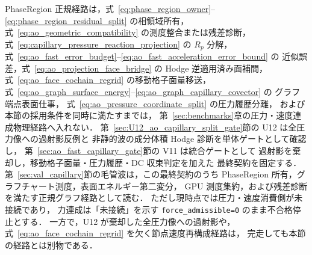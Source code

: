 PhaseRegion 正規経路は，式~\eqref{eq:phase_region_owner}--\eqref{eq:phase_region_residual_split} の相領域所有，
式~\eqref{eq:ao_geometric_compatibility} の測度整合または残差診断，
式~\eqref{eq:capillary_pressure_reaction_projection} の $R_p$ 分解，
式~\eqref{eq:ao_fast_error_budget}--\eqref{eq:ao_fast_acceleration_error_bound} の
近似誤差，式~\eqref{eq:ao_projection_face_bridge} の Hodge 逆適用済み面補間，
式~\eqref{eq:ao_face_cochain_regrid} の移動格子面量移送，
式~\eqref{eq:ao_graph_surface_energy}--\eqref{eq:ao_graph_capillary_covector} の
グラフ端点表面仕事，
式~\eqref{eq:ao_pressure_coordinate_split} の圧力履歴分離，
および本節の採用条件を同時に満たすまでは，
第~\ref{sec:benchmarks}章の圧力・速度連成物理経路へ入れない．
第~\ref{sec:U12_ao_capillary_split_gate}節の U12 は全圧力像への過射影反例と
非静的波の成分体積 Hodge 診断を単体ゲートとして確認し，
第~\ref{sec:ao_fast_capillary_gate}節の V11 は統合ゲートとして
過射影を棄却し，移動格子面量・圧力履歴・DC 収束判定を加えた
最終契約を固定する．
第~\ref{sec:val_capillary}節の毛管波は，この最終契約のうち
PhaseRegion 所有，グラフチャート測度，表面エネルギー第二変分，
GPU 測度集約，および残差診断を満たす正規グラフ経路として読む．
ただし現時点では圧力・速度消費側が未接続であり，
力連成は「未接続」を示す \texttt{force\_admissible=0} のまま不合格停止とする．
一方で，U12 が棄却した全圧力像への過射影や，
式~\eqref{eq:ao_face_cochain_regrid} を欠く節点速度再構成経路は，
完走しても本節の経路とは別物である．
